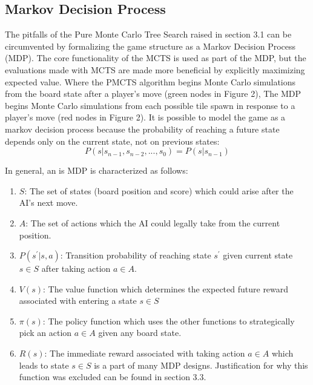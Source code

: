 \documentclass{article}
\begin{document}
\subsection{Markov Decision Process}
The pitfalls of the Pure Monte Carlo Tree Search raised in section 3.1 can be circumvented by formalizing the game structure as a Markov Decision Process (MDP).  The core functionality of the MCTS is used as part of the MDP, but the evaluations made with MCTS are made more beneficial by explicitly maximizing expected value.  Where the PMCTS algorithm begins Monte Carlo simulations from the board state after a player's move (green nodes in Figure 2), The MDP begins Monte Carlo simulations from each possible tile spawn in response to a player's move (red nodes in Figure 2).  It is possible to model the game as a markov decision process because the probability of reaching a future state depends only on the current state, not on previous states: 
$$P(s|s_{n-1}, s_{n-2},...,s_{0}) = P(s|s_{n-1}) $$

In general, an is MDP is characterized as follows:
\begin{enumerate}
	\item $S$: The set of states (board position and score) which could arise after the AI's next move.
	\item $A$: The set of actions which the AI could legally take from the current position.
	\item $P(s^\prime | s, a)$: Transition probability of reaching state $s^\prime$ given current state $s \in S$ after taking action $a \in A$.
	\item $V(s)$: The value function which determines the expected future reward associated with entering a state $s \in S$
	\item $\pi(s)$: The policy function which uses the other functions to strategically pick an action $a \in A$ given any board state.
	\item $R(s)$: The immediate reward associated with taking action $a \in A$ which leads to state $s \in S$ is a part of many MDP designs.  Justification for why this function was excluded can be found in section 3.3.
\end{enumerate}
\end{document}
